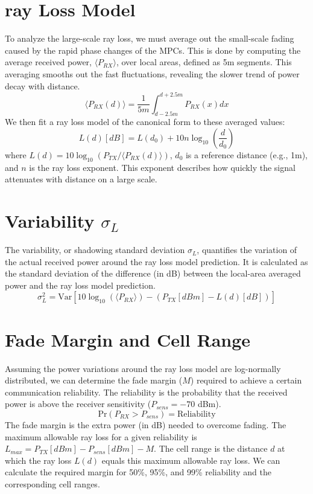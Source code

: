 \section{ray Loss Model}
To analyze the large-scale ray loss, we must average out the small-scale fading caused by the rapid phase changes of the MPCs. This is done by computing the average received power, $\langle P_{RX} \rangle$, over local areas, defined as 5m segments. This averaging smooths out the fast fluctuations, revealing the slower trend of power decay with distance.
\begin{equation}
	\langle P_{RX}(d) \rangle = \frac{1}{5m} \int_{d-2.5m}^{d+2.5m} P_{RX}(x) dx
\end{equation}
We then fit a ray loss model of the canonical form to these averaged values:
\begin{equation}
	L(d) [dB] = L(d_0) + 10n \log_{10}\left(\frac{d}{d_0}\right)
\end{equation}
where $L(d) = 10 \log_{10}(P_{TX} / \langle P_{RX}(d) \rangle)$, $d_0$ is a reference distance (e.g., 1m), and $n$ is the ray loss exponent. This exponent describes how quickly the signal attenuates with distance on a large scale.

\section{Variability $\sigma_L$}
The variability, or shadowing standard deviation $\sigma_L$, quantifies the variation of the actual received power around the ray loss model prediction. It is calculated as the standard deviation of the difference (in dB) between the local-area averaged power and the ray loss model prediction.
\begin{equation}
	\sigma_L^2 = \text{Var} \left[ 10\log_{10}(\langle P_{RX} \rangle) - (P_{TX}[dBm] - L(d)[dB]) \right]
\end{equation}

\section{Fade Margin and Cell Range}
Assuming the power variations around the ray loss model are log-normally distributed, we can determine the fade margin ($M$) required to achieve a certain communication reliability. The reliability is the probability that the received power is above the receiver sensitivity ($P_{sens} = -70$ dBm).
\begin{equation}
	\text{Pr}(P_{RX} > P_{sens}) = \text{Reliability}
\end{equation}
The fade margin is the extra power (in dB) needed to overcome fading. The maximum allowable ray loss for a given reliability is $L_{max} = P_{TX}[dBm] - P_{sens}[dBm] - M$. The cell range is the distance $d$ at which the ray loss $L(d)$ equals this maximum allowable ray loss. We can calculate the required margin for 50\%, 95\%, and 99\% reliability and the corresponding cell ranges.

